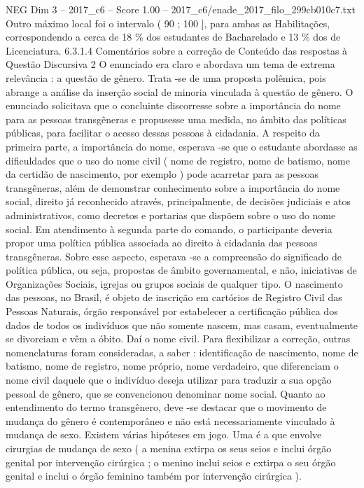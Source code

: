 \begin{textsample}{NEG Dim 3 – 2017\_c6 – Score 1.00 – 2017\_c6/enade\_2017\_filo\_299cb010c7.txt}
Outro máximo local foi o intervalo ( 90 ; 100 ], para ambas as Habilitações, correspondendo a cerca de 18 \% dos estudantes de Bacharelado e 13 \% dos de Licenciatura. 6.3.1.4 Comentários sobre a correção de Conteúdo das respostas à Questão Discursiva 2 O enunciado era claro e abordava um tema de extrema relevância : a questão de gênero.
Trata -se de uma proposta polêmica, pois abrange a análise da inserção social de minoria vinculada à questão de gênero.
O enunciado solicitava que o concluinte discorresse sobre a importância do nome para as pessoas transgêneras e propusesse uma medida, no âmbito das políticas públicas, para facilitar o acesso dessas pessoas à cidadania.
A respeito da primeira parte, a importância do nome, esperava -se que o estudante abordasse as dificuldades que o uso do nome civil ( nome de registro, nome de batismo, nome da certidão de nascimento, por exemplo ) pode acarretar para as pessoas transgêneras, além de demonstrar conhecimento sobre a importância do nome social, direito já reconhecido através, principalmente, de decisões judiciais e atos administrativos, como decretos e portarias que dispõem sobre o uso do nome social.
Em atendimento à segunda parte do comando, o participante deveria propor uma política pública associada ao direito à cidadania das pessoas transgêneras.
Sobre esse aspecto, esperava -se a compreensão do significado de política pública, ou seja, propostas de âmbito governamental, e não, iniciativas de Organizações Sociais, igrejas ou grupos sociais de qualquer tipo.
O nascimento das pessoas, no Brasil, é objeto de inscrição em cartórios de Registro Civil das Pessoas Naturais, órgão responsável por estabelecer a certificação pública dos dados de todos os indivíduos que não somente nascem, mas casam, eventualmente se divorciam e vêm a óbito.
Daí o nome civil.
Para flexibilizar a correção, outras nomenclaturas foram consideradas, a saber : identificação de nascimento, nome de batismo, nome de registro, nome próprio, nome verdadeiro, que diferenciam o nome civil daquele que o indivíduo deseja utilizar para traduzir a sua opção pessoal de gênero, que se convencionou denominar nome social.
Quanto ao entendimento do termo transgênero, deve -se destacar que o movimento de mudança do gênero é contemporâneo e não está necessariamente vinculado à mudança de sexo.
Existem várias hipóteses em jogo.
Uma é a que envolve cirurgias de mudança de sexo ( a menina extirpa os seus seios e inclui órgão genital por intervenção cirúrgica ; o menino inclui seios e extirpa o seu órgão genital e inclui o órgão feminino também por intervenção cirúrgica ).

\end{textsample}
